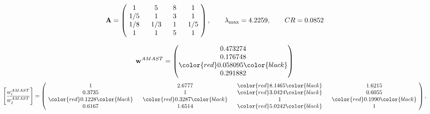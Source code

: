 \begin{example}
\begin{equation*}
\mathbf{A} =
\begin{pmatrix}
$\,\,$ 1 $\,\,$ & $\,\,$5$\,\,$ & $\,\,$8$\,\,$ & $\,\,$1 $\,\,$ \\
$\,\,$ 1/5$\,\,$ & $\,\,$ 1 $\,\,$ & $\,\,$3$\,\,$ & $\,\,$1 $\,\,$ \\
$\,\,$ 1/8$\,\,$ & $\,\,$ 1/3$\,\,$ & $\,\,$ 1 $\,\,$ & $\,\,$ 1/5 $\,\,$ \\
$\,\,$ 1 $\,\,$ & $\,\,$ 1 $\,\,$ & $\,\,$5$\,\,$ & $\,\,$ 1  $\,\,$ \\
\end{pmatrix},
\qquad
\lambda_{\max} =
4.2259,
\qquad
CR = 0.0852
\end{equation*}

\begin{equation*}
\mathbf{w}^{AMAST} =
\begin{pmatrix}
0.473274\\
0.176748\\
\color{red} 0.058095\color{black} \\
0.291882
\end{pmatrix}\end{equation*}
\begin{equation*}
\left[ \frac{{w}^{AMAST}_i}{{w}^{AMAST}_j} \right] =
\begin{pmatrix}
$\,\,$ 1 $\,\,$ & $\,\,$2.6777$\,\,$ & $\,\,$\color{red} 8.1465\color{black} $\,\,$ & $\,\,$1.6215$\,\,$ \\
$\,\,$0.3735$\,\,$ & $\,\,$ 1 $\,\,$ & $\,\,$\color{red} 3.0424\color{black} $\,\,$ & $\,\,$0.6055  $\,\,$ \\
$\,\,$\color{red} 0.1228\color{black} $\,\,$ & $\,\,$\color{red} 0.3287\color{black} $\,\,$ & $\,\,$ 1 $\,\,$ & $\,\,$\color{red} 0.1990\color{black}  $\,\,$ \\
$\,\,$0.6167$\,\,$ & $\,\,$1.6514$\,\,$ & $\,\,$\color{red} 5.0242\color{black} $\,\,$ & $\,\,$ 1  $\,\,$ \\
\end{pmatrix},
\end{equation*}


\end{example}
